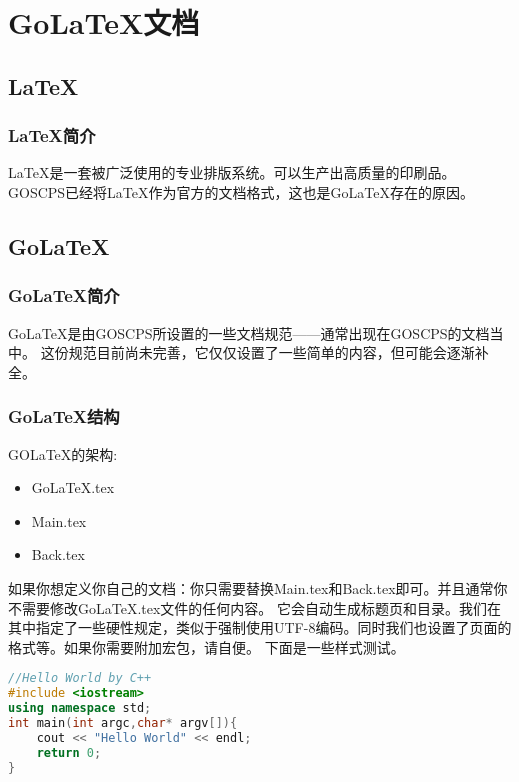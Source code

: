 \chapter{Go\LaTeX{}文档}
\section{\LaTeX{}}
\subsection{\LaTeX{}简介}

\LaTeX{}是一套被广泛使用的专业排版系统。可以生产出高质量的印刷品。
GOSCPS已经将\LaTeX{}作为官方的文档格式，这也是Go\LaTeX{}存在的原因。

\section{Go\LaTeX{}}
\subsection{Go\LaTeX{}简介}
Go\LaTeX{}是由GOSCPS所设置的一些文档规范——通常出现在G\-OS\-CP\-S的文档当中。
这份规范目前尚未完善，它仅仅设置了一些简单的内容，但可能会逐渐补全。

\subsection{Go\LaTeX{}结构}
GO\LaTeX{}的架构:

\begin{itemize}
    \item Go\LaTeX{}.tex
    \item Main.tex
    \item Back.tex
\end{itemize}

如果你想定义你自己的文档：你只需要替换Main.tex和Back.tex即可。并且通常你不需要修改Go\LaTeX{}.tex文件的任何内容。
它会自动生成标题页和目录。我们在其中指定了一些硬性规定，类似于强制使用UTF-8编码。同时我们也设置了页面的格式等。如果你需要附加宏包，请自便。
\newline{}
下面是一些样式测试。

\begin{lstlisting}[language=C++]
//Hello World by C++
#include <iostream>
using namespace std;
int main(int argc,char* argv[]){
	cout << "Hello World" << endl;
	return 0;
}
\end{lstlisting}
